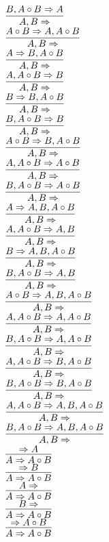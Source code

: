\documentclass[11pt]{article}
\begin{document}
\begin{center}
\bigskip
\\$\infer{A, B\Rightarrow }{B, A\circ B\Rightarrow A}$
\bigskip
\\$\infer{A, B\Rightarrow }{A\circ B\Rightarrow A, A\circ B}$
\bigskip
\\$\infer{A, B\Rightarrow }{A\Rightarrow B, A\circ B}$
\bigskip
\\$\infer{A, B\Rightarrow }{A, A\circ B\Rightarrow B}$
\bigskip
\\$\infer{A, B\Rightarrow }{B\Rightarrow B, A\circ B}$
\bigskip
\\$\infer{A, B\Rightarrow }{B, A\circ B\Rightarrow B}$
\bigskip
\\$\infer{A, B\Rightarrow }{A\circ B\Rightarrow B, A\circ B}$
\bigskip
\\$\infer{A, B\Rightarrow }{A, A\circ B\Rightarrow A\circ B}$
\bigskip
\\$\infer{A, B\Rightarrow }{B, A\circ B\Rightarrow A\circ B}$
\bigskip
\\$\infer{A, B\Rightarrow }{A\Rightarrow A, B, A\circ B}$
\bigskip
\\$\infer{A, B\Rightarrow }{A, A\circ B\Rightarrow A, B}$
\bigskip
\\$\infer{A, B\Rightarrow }{B\Rightarrow A, B, A\circ B}$
\bigskip
\\$\infer{A, B\Rightarrow }{B, A\circ B\Rightarrow A, B}$
\bigskip
\\$\infer{A, B\Rightarrow }{A\circ B\Rightarrow A, B, A\circ B}$
\bigskip
\\$\infer{A, B\Rightarrow }{A, A\circ B\Rightarrow A, A\circ B}$
\bigskip
\\$\infer{A, B\Rightarrow }{B, A\circ B\Rightarrow A, A\circ B}$
\bigskip
\\$\infer{A, B\Rightarrow }{A, A\circ B\Rightarrow B, A\circ B}$
\bigskip
\\$\infer{A, B\Rightarrow }{B, A\circ B\Rightarrow B, A\circ B}$
\bigskip
\\$\infer{A, B\Rightarrow }{A, A\circ B\Rightarrow A, B, A\circ B}$
\bigskip
\\$\infer{A, B\Rightarrow }{B, A\circ B\Rightarrow A, B, A\circ B}$
\bigskip
\\$\infer{A\Rightarrow A\circ B}{\Rightarrow A}$
\bigskip
\\$\infer{A\Rightarrow A\circ B}{\Rightarrow B}$
\bigskip
\\$\infer{A\Rightarrow A\circ B}{A\Rightarrow }$
\bigskip
\\$\infer{A\Rightarrow A\circ B}{B\Rightarrow }$
\bigskip
\\$\infer{A\Rightarrow A\circ B}{\Rightarrow A\circ B}$

\end{center}
\end{document}
